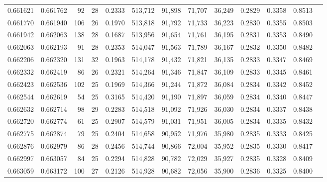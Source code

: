 \begin{tabular}{rrrrrrrrrrrrr}
0.661621 & 0.661762 &    92 &  28 &                                     0.2333 & 513,712 &  91,898 &  71,707 &  36,249 & 0.2829 & 0.3358 & 0.8513 \\
0.661770 & 0.661940 &   106 &  26 &                                     0.1970 & 513,818 &  91,792 &  71,733 &  36,223 & 0.2830 & 0.3355 & 0.8503 \\
0.661942 & 0.662063 &   138 &  28 &                                     0.1687 & 513,956 &  91,654 &  71,761 &  36,195 & 0.2831 & 0.3353 & 0.8490 \\
0.662063 & 0.662193 &    91 &  28 &                                     0.2353 & 514,047 &  91,563 &  71,789 &  36,167 & 0.2832 & 0.3350 & 0.8482 \\
0.662206 & 0.662320 &   131 &  32 &                                     0.1963 & 514,178 &  91,432 &  71,821 &  36,135 & 0.2833 & 0.3347 & 0.8469 \\
0.662332 & 0.662419 &    86 &  26 &                                     0.2321 & 514,264 &  91,346 &  71,847 &  36,109 & 0.2833 & 0.3345 & 0.8461 \\
0.662423 & 0.662536 &   102 &  25 &                                     0.1969 & 514,366 &  91,244 &  71,872 &  36,084 & 0.2834 & 0.3342 & 0.8452 \\
0.662544 & 0.662619 &    54 &  25 &                                     0.3165 & 514,420 &  91,190 &  71,897 &  36,059 & 0.2834 & 0.3340 & 0.8447 \\
0.662632 & 0.662714 &    98 &  29 &                                     0.2283 & 514,518 &  91,092 &  71,926 &  36,030 & 0.2834 & 0.3337 & 0.8438 \\
0.662720 & 0.662774 &    61 &  25 &                                     0.2907 & 514,579 &  91,031 &  71,951 &  36,005 & 0.2834 & 0.3335 & 0.8432 \\
0.662775 & 0.662874 &    79 &  25 &                                     0.2404 & 514,658 &  90,952 &  71,976 &  35,980 & 0.2835 & 0.3333 & 0.8425 \\
0.662876 & 0.662979 &    86 &  28 &                                     0.2456 & 514,744 &  90,866 &  72,004 &  35,952 & 0.2835 & 0.3330 & 0.8417 \\
0.662997 & 0.663057 &    84 &  25 &                                     0.2294 & 514,828 &  90,782 &  72,029 &  35,927 & 0.2835 & 0.3328 & 0.8409 \\
0.663059 & 0.663172 &   100 &  27 &                                     0.2126 & 514,928 &  90,682 &  72,056 &  35,900 & 0.2836 & 0.3325 & 0.8400 \\

\end{tabular}
